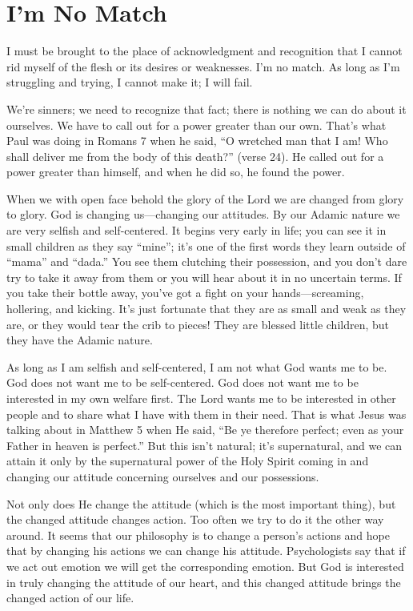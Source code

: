 \section*{I'm No Match}

I must be brought to the place of acknowledgment and
recognition that I cannot rid myself of the flesh or its desires
or weaknesses. I’m no match. As long as I’m struggling and
trying, I cannot make it; I will fail.

We're sinners; we need to recognize that fact; there is
nothing we can do about it ourselves. We have to call out
for a power greater than our own. That’s what Paul was
doing in Romans 7 when he said, “O wretched man that
I am! Who shall deliver me from the body of this death?”
(verse 24). He called out for a power greater than himself,
and when he did so, he found the power.

When we with open face behold the glory of the Lord
we are changed from glory to glory. God is changing
us—changing our attitudes. By our Adamic nature we are
very selfish and self-centered. It begins very early in life;
you can see it in small children as they say “mine”; it’s one
of the first words they learn outside of “mama” and “dada.”
You see them clutching their possession, and you don’t dare
try to take it away from them or you will hear about it in no
uncertain terms. If you take their bottle away, you’ve got a
fight on your hands—screaming, hollering, and kicking. It’s
just fortunate that they are as small and weak as they are,
or they would tear the crib to pieces! They are blessed little
children, but they have the Adamic nature.

As long as I am selfish and self-centered, I am not what
God wants me to be. God does not want me to be self-centered.
God does not want me to be interested in my own
welfare first. The Lord wants me to be interested in other
people and to share what I have with them in their need.
That is what Jesus was talking about in Matthew 5 when He
said, “Be ye therefore perfect; even as your Father in heaven
is perfect.” But this isn’t natural; it’s supernatural, and we
can attain it only by the supernatural power of the Holy
Spirit coming in and changing our attitude concerning ourselves
and our possessions.

Not only does He change the attitude (which is the most
important thing), but the changed attitude changes action.
Too often we try to do it the other way around. It seems that
our philosophy is to change a person’s actions and hope
that by changing his actions we can change his attitude.
Psychologists say that if we act out emotion we will get
the corresponding emotion. But God is interested in truly
changing the attitude of our heart, and this changed attitude
brings the changed action of our life.



